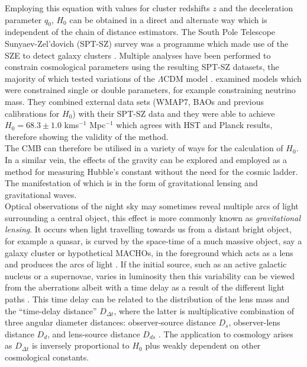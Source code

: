 \documentclass[12pt, onecolumn]{revtex4}    %
\begin{document}
Employing this equation with values for cluster redshifts $z$ and the deceleration parameter $q_0$, $H_0$ can be obtained in a direct and alternate way which is independent of the chain of distance estimators. The South Pole Telescope Sunyaev-Zel'dovich (SPT-SZ) survey was a programme which made use of the SZE to detect galaxy clusters \citep{2009AIPC.1185..475C}. Multiple analyses have been performed to constrain cosmological parameters using the resulting SPT-SZ datasets, the majority of which tested variations of the $\Lambda$CDM model \citep{2014ApJ...782...74H, 2016ApJ...832...95D}. \cite{2014ApJ...782...74H} examined models which were constrained single or double parameters, for example constraining neutrino mass. They combined external data sets (WMAP7, BAOs and previous calibrations for $H_0$) with their SPT-SZ data and they were able to achieve $H_0=68.3\pm1.0$ kms$^{-1}$ Mpc$^{-1}$ which agrees with HST and Planck results, therefore showing the validity of the method. \\


The CMB can therefore be utilised in a variety of ways for the calculation of $H_0$. In a similar vein, the effects of the gravity can be explored and employed as a method for measuring Hubble's constant without the need for the cosmic ladder. The manifestation of which is in the form of gravitational lensing and gravitational waves. \\

Optical observations of the night sky may sometimes reveal multiple arcs of light surrounding a central object, this effect is more commonly known as \textit{gravitational lensing}. It occurs when light travelling towards us from a distant bright object, for example a quasar, is curved by the space-time of a much massive object, say a galaxy cluster or hypothetical MACHOs, in the foreground which acts as a lens and produces the arcs of light \citep{carroll_astro}. If the initial source, such as an active galactic nucleus or a supernovae, varies in luminosity then this variability can be viewed from the aberrations albeit with a time delay as a result of the different light paths \citep{suyu_2017}. This time delay can be related to the distribution of the lens mass and the ``time-delay distance'' $D_{\Delta t}$, where the latter is multiplicative combination of three angular diameter distances: observer-source distance $D_s$, observer-lens distance $D_d$, and lens-source distance $D_{ds}$ \citep{suyu_2017, 2018MNRAS.473..210S}. The application to cosmology arises as $D_{\Delta t}$ is inversely proportional to $H_0$ plus weakly dependent on other cosmological constants. \\
\end{document}
